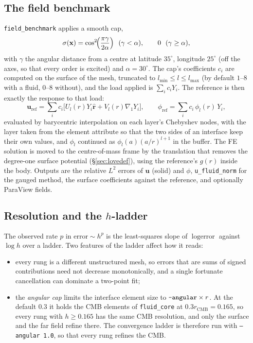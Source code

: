 \documentclass[11pt]{article}
\numberwithin{equation}{section}
\newcommand{\vu}{\mathbf{u}}
\newcommand{\vx}{\mathbf{x}}
\newcommand{\rhat}{\hat{\mathbf{r}}}
\newcommand{\code}[1]{\texttt{#1}}
\newcommand{\gradone}{\nabla_{1}}
\begin{document}
\subsection{The field benchmark}

\code{field\_benchmark} applies a smooth cap,
\begin{equation}
  \sigma(\vx) = \cos^2\!\Bigl(\frac{\pi\gamma}{2\alpha}\Bigr)\ \ (\gamma<\alpha),
  \qquad 0\ \ (\gamma\ge\alpha),
  \label{eq:cap}
\end{equation}
with $\gamma$ the angular distance from a centre at latitude $35^\circ$,
longitude $25^\circ$ (off the axes, so that every order is excited) and
$\alpha=30^\circ$. The cap's coefficients $c_i$ are computed on the
surface of the mesh, truncated to $l_{\min}\le l\le l_{\max}$ (by default
$1$--$8$ with a fluid, $0$--$8$ without), and the load applied is
$\sum_i c_iY_i$. The reference is then exactly the response to that load:
\begin{equation}
  \vu_{\text{ref}} = \sum_i c_i\bigl[U_{l}(r)Y_i\rhat + V_l(r)\gradone Y_i\bigr],
  \qquad
  \phi_{\text{ref}} = \sum_i c_i\,\phi_l(r)\,Y_i,
  \label{eq:fieldref}
\end{equation}
evaluated by barycentric interpolation on each layer's Chebyshev nodes,
with the layer taken from the element attribute so that the two sides of
an interface keep their own values, and $\phi_l$ continued as
$\phi_l(a)(a/r)^{l+1}$ in the buffer. The FE solution is moved to the
centre-of-mass frame by the translation that removes the degree-one
surface potential (\S\ref{sec:lovedef}), using the reference's $g(r)$
inside the body. Outputs are the relative $L^2$ errors of $\vu$ (solid)
and $\phi$, \code{u\_fluid\_norm} for the gauged method, the surface
coefficients against the reference, and optionally ParaView fields.

\subsection{\texorpdfstring{Resolution and the $h$-ladder}{Resolution and the h-ladder}}
\label{sec:ladder}

The observed rate $p$ in $\text{error}\sim h^p$ is the least-squares
slope of $\log\text{error}$ against $\log h$ over a ladder. Two features
of the ladder affect how it reads:
\begin{itemize}[leftmargin=*]
\item every rung is a different unstructured mesh, so errors that are
  sums of signed contributions need not decrease monotonically, and a
  single fortunate cancellation can dominate a two-point fit;
\item the \emph{angular cap} limits the interface element size to
  $\text{\code{--angular}}\times r$. At the default $0.3$ it holds the CMB
  elements of \code{fluid\_core} at $0.3r_{\text{CMB}}=0.165$, so every rung
  with $h\ge 0.165$ has the same CMB resolution, and only the surface and
  the far field refine there. The convergence ladder is therefore run with
  \code{--angular 1.0}, so that every rung refines the CMB.
\end{itemize}
\end{document}
